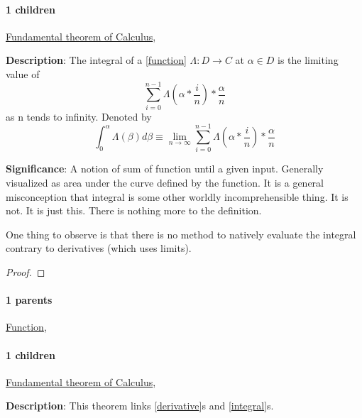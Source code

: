 \documentclass[./main.tex]{subfiles}
\begin{document}
\paragraph{1 children} \hyperref[statement:Fundamental theorem of Calculus]{Fundamental theorem of Calculus}, 



\begin{statement}
\label{statement:Integral}\hspace*{0pt}\par
\end{statement}
\textbf{Description}:
The integral of a [\hyperref[statement:Function]{function}] $\Lambda : D \to C $ at $\alpha \in D$ is the limiting value of
\[
  \sum_{i=0}^{n-1} \Lambda(\alpha * \frac{i}{n}) * \frac{\alpha}{n}
\]
as n tends to infinity.
Denoted by
\[
  \int_{0}^{\alpha} \Lambda(\beta) d\beta \equiv \lim_{n \to \infty}\sum_{i=0}^{n-1} \Lambda(\alpha * \frac{i}{n}) * \frac{\alpha}{n}
\]
\par
{\color{magenta} \textbf{Significance}:
A notion of sum of function until a given input.
Generally visualized as area under the curve defined by the function.
It is a general misconception that integral is some other worldly incomprehensible thing.
It is not.
It is just this.
There is nothing more to the definition.

One thing to observe is that there is no method to natively evaluate the integral contrary to derivatives (which uses limits).
\par}
\begin{proof}
\proofbydefinition
\end{proof}\par
\paragraph{1 parents} \hyperref[statement:Function]{Function}, 
\paragraph{1 children} \hyperref[statement:Fundamental theorem of Calculus]{Fundamental theorem of Calculus}, 



\begin{statement}
\label{statement:Fundamental theorem of Calculus}\hspace*{0pt}\par
\end{statement}
\textbf{Description}:
This theorem links [\hyperref[statement:Derivative]{derivative}]s and [\hyperref[statement:Integral]{integral}]s.
\end{document}
